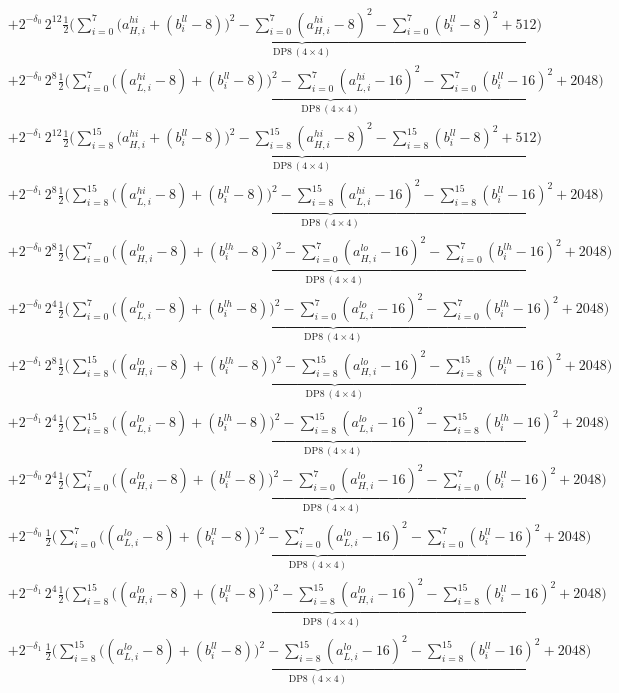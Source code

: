 \documentclass[fleqn]{article}
\newcommand{\DPop}[3]{\mathrm{DP#1}\,(#2\!\times\!#3)}
\begin{document}
{\begin{align*}
  & + 2^{-\delta_0}\,2^{12}\underbrace{\tfrac12\Big(\sum_{i=0}^{7}\big(a_{H,i}^{hi}{+}(b_i^{ll}{-}8)\big)^2 - \sum_{i=0}^{7}(a_{H,i}^{hi}{-}8)^2 - \sum_{i=0}^{7}(b_i^{ll}{-}8)^2 + 512\Big)}_{\DPop{8}{4}{4}} \\[0.25em]
  & + 2^{-\delta_0}\,2^{8}\underbrace{\tfrac12\Big(\sum_{i=0}^{7}\big((a_{L,i}^{hi}{-}8){+}(b_i^{ll}{-}8)\big)^2 - \sum_{i=0}^{7}(a_{L,i}^{hi}{-}16)^2 - \sum_{i=0}^{7}(b_i^{ll}{-}16)^2 + 2048\Big)}_{\DPop{8}{4}{4}} \\[0.25em]
  & + 2^{-\delta_1}\,2^{12}\underbrace{\tfrac12\Big(\sum_{i=8}^{15}\big(a_{H,i}^{hi}{+}(b_i^{ll}{-}8)\big)^2 - \sum_{i=8}^{15}(a_{H,i}^{hi}{-}8)^2 - \sum_{i=8}^{15}(b_i^{ll}{-}8)^2 + 512\Big)}_{\DPop{8}{4}{4}} \\[0.25em]
  & + 2^{-\delta_1}\,2^{8}\underbrace{\tfrac12\Big(\sum_{i=8}^{15}\big((a_{L,i}^{hi}{-}8){+}(b_i^{ll}{-}8)\big)^2 - \sum_{i=8}^{15}(a_{L,i}^{hi}{-}16)^2 - \sum_{i=8}^{15}(b_i^{ll}{-}16)^2 + 2048\Big)}_{\DPop{8}{4}{4}} \\[0.25em]
  & + 2^{-\delta_0}\,2^{8}\underbrace{\tfrac12\Big(\sum_{i=0}^{7}\big((a_{H,i}^{lo}{-}8){+}(b_i^{lh}{-}8)\big)^2 - \sum_{i=0}^{7}(a_{H,i}^{lo}{-}16)^2 - \sum_{i=0}^{7}(b_i^{lh}{-}16)^2 + 2048\Big)}_{\DPop{8}{4}{4}} \\[0.25em]
  & + 2^{-\delta_0}\,2^{4}\underbrace{\tfrac12\Big(\sum_{i=0}^{7}\big((a_{L,i}^{lo}{-}8){+}(b_i^{lh}{-}8)\big)^2 - \sum_{i=0}^{7}(a_{L,i}^{lo}{-}16)^2 - \sum_{i=0}^{7}(b_i^{lh}{-}16)^2 + 2048\Big)}_{\DPop{8}{4}{4}} \\[0.25em]
  & + 2^{-\delta_1}\,2^{8}\underbrace{\tfrac12\Big(\sum_{i=8}^{15}\big((a_{H,i}^{lo}{-}8){+}(b_i^{lh}{-}8)\big)^2 - \sum_{i=8}^{15}(a_{H,i}^{lo}{-}16)^2 - \sum_{i=8}^{15}(b_i^{lh}{-}16)^2 + 2048\Big)}_{\DPop{8}{4}{4}} \\[0.25em]
  & + 2^{-\delta_1}\,2^{4}\underbrace{\tfrac12\Big(\sum_{i=8}^{15}\big((a_{L,i}^{lo}{-}8){+}(b_i^{lh}{-}8)\big)^2 - \sum_{i=8}^{15}(a_{L,i}^{lo}{-}16)^2 - \sum_{i=8}^{15}(b_i^{lh}{-}16)^2 + 2048\Big)}_{\DPop{8}{4}{4}} \\[0.25em]
  & + 2^{-\delta_0}\,2^{4}\underbrace{\tfrac12\Big(\sum_{i=0}^{7}\big((a_{H,i}^{lo}{-}8){+}(b_i^{ll}{-}8)\big)^2 - \sum_{i=0}^{7}(a_{H,i}^{lo}{-}16)^2 - \sum_{i=0}^{7}(b_i^{ll}{-}16)^2 + 2048\Big)}_{\DPop{8}{4}{4}} \\[0.25em]
  & + 2^{-\delta_0}\,\underbrace{\tfrac12\Big(\sum_{i=0}^{7}\big((a_{L,i}^{lo}{-}8){+}(b_i^{ll}{-}8)\big)^2 - \sum_{i=0}^{7}(a_{L,i}^{lo}{-}16)^2 - \sum_{i=0}^{7}(b_i^{ll}{-}16)^2 + 2048\Big)}_{\DPop{8}{4}{4}} \\[0.25em]
  & + 2^{-\delta_1}\,2^{4}\underbrace{\tfrac12\Big(\sum_{i=8}^{15}\big((a_{H,i}^{lo}{-}8){+}(b_i^{ll}{-}8)\big)^2 - \sum_{i=8}^{15}(a_{H,i}^{lo}{-}16)^2 - \sum_{i=8}^{15}(b_i^{ll}{-}16)^2 + 2048\Big)}_{\DPop{8}{4}{4}} \\[0.25em]
  & + 2^{-\delta_1}\,\underbrace{\tfrac12\Big(\sum_{i=8}^{15}\big((a_{L,i}^{lo}{-}8){+}(b_i^{ll}{-}8)\big)^2 - \sum_{i=8}^{15}(a_{L,i}^{lo}{-}16)^2 - \sum_{i=8}^{15}(b_i^{ll}{-}16)^2 + 2048\Big)}_{\DPop{8}{4}{4}}
\end{align*}
}
\end{document}
